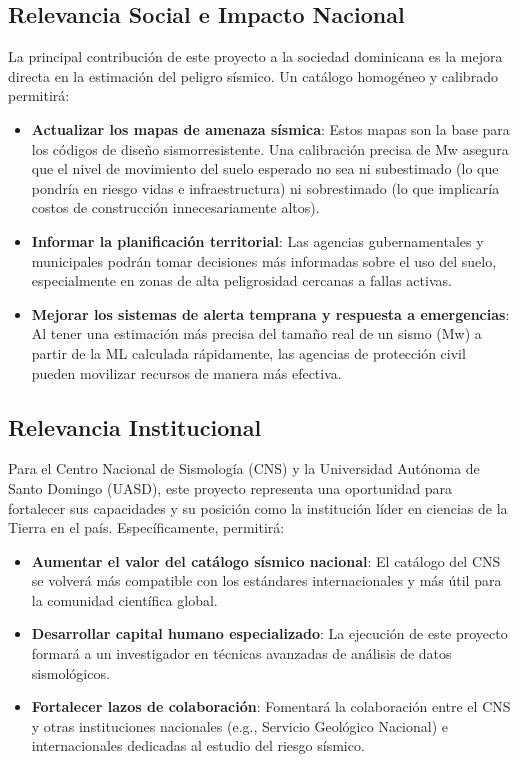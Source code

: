 \documentclass[12pt,a4paper]{article}
\begin{document}
\subsection{Relevancia Social e Impacto Nacional}
La principal contribución de este proyecto a la sociedad dominicana es la mejora directa en la estimación del peligro sísmico. Un catálogo homogéneo y calibrado permitirá:
\begin{itemize}
    \item \textbf{Actualizar los mapas de amenaza sísmica}: Estos mapas son la base para los códigos de diseño sismorresistente. Una calibración precisa de Mw asegura que el nivel de movimiento del suelo esperado no sea ni subestimado (lo que pondría en riesgo vidas e infraestructura) ni sobrestimado (lo que implicaría costos de construcción innecesariamente altos).
    \item \textbf{Informar la planificación territorial}: Las agencias gubernamentales y municipales podrán tomar decisiones más informadas sobre el uso del suelo, especialmente en zonas de alta peligrosidad cercanas a fallas activas.
    \item \textbf{Mejorar los sistemas de alerta temprana y respuesta a emergencias}: Al tener una estimación más precisa del tamaño real de un sismo (Mw) a partir de la ML calculada rápidamente, las agencias de protección civil pueden movilizar recursos de manera más efectiva.
\end{itemize}

\subsection{Relevancia Institucional}
Para el Centro Nacional de Sismología (CNS) y la Universidad Autónoma de Santo Domingo (UASD), este proyecto representa una oportunidad para fortalecer sus capacidades y su posición como la institución líder en ciencias de la Tierra en el país. Específicamente, permitirá:
\begin{itemize}
    \item \textbf{Aumentar el valor del catálogo sísmico nacional}: El catálogo del CNS se volverá más compatible con los estándares internacionales y más útil para la comunidad científica global.
    \item \textbf{Desarrollar capital humano especializado}: La ejecución de este proyecto formará a un investigador en técnicas avanzadas de análisis de datos sismológicos.
    \item \textbf{Fortalecer lazos de colaboración}: Fomentará la colaboración entre el CNS y otras instituciones nacionales (e.g., Servicio Geológico Nacional) e internacionales dedicadas al estudio del riesgo sísmico.
\end{itemize}
\end{document}
